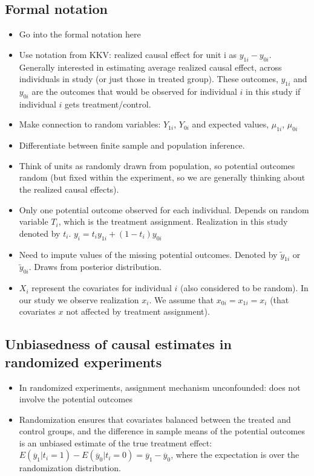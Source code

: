 \documentclass[11pt,titlepage]{article}
\begin{document}
\subsection{Formal notation}
\begin{itemize}
\item Go into the formal notation here
\item Use notation from KKV: realized causal effect for unit i as
  $y_{1i} - y_{0i}$.  Generally interested in estimating average
  realized causal effect, across individuals in study (or just those
  in treated group).  These outcomes, $y_{1i}$ and $y_{0i}$ are the
  outcomes that would be observed for individual $i$ in this study if
  individual $i$ gets treatment/control.
\item Make connection to random variables: $Y_{1i}$, $Y_{0i}$ and
  expected values, $\mu_{1i}$, $\mu_{0i}$
\item Differentiate between finite sample and population inference.
\item Think of units as randomly drawn from population, so potential
  outcomes random (but fixed within the experiment, so we are
  generally thinking about the realized causal effects).
\item Only one potential outcome observed for each individual.
  Depends on random variable $T_i$, which is the treatment assignment.
  Realization in this study denoted by $t_i$.  $y_i = t_i y_{1i} +
  (1-t_i) y_{0i}$
\item Need to impute values of the missing potential outcomes.
  Denoted by $\tilde{y}_{1i}$ or $\tilde{y}_{0i}$.  Draws from
  posterior distribution.
\item $X_i$ represent the covariates for individual $i$ (also
  considered to be random).  In our study we observe realization
  $x_i$.  We assume that $x_{0i}=x_{1i}=x_i$ (that covariates $x$ not
  affected by treatment assignment).
\end{itemize}

\subsection{Unbiasedness of causal estimates in randomized experiments}
\begin{itemize}
\item In randomized experiments, assignment mechanism unconfounded:
  does not involve the potential outcomes
\item Randomization ensures that covariates balanced between the
  treated and control groups, and the difference in sample means of
  the potential outcomes is an unbiased estimate of the true treatment
  effect: $E(\overline{y}_1|t_i=1) - E(\overline{y}_0|t_i=0) =
  \overline{y}_1 - \overline{y}_0$, where the expectation is over the
  randomization distribution.
\end{itemize} 
\end{document}
